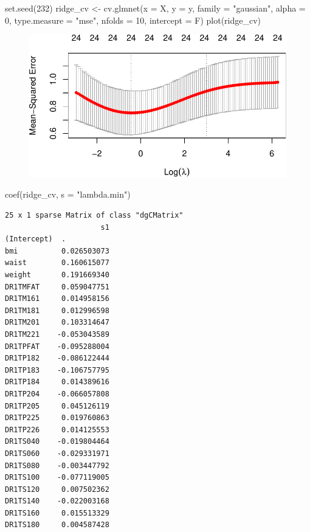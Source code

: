 \documentclass[
  letterpaper,
  DIV=11,
  numbers=noendperiod]{scrreport}
\newenvironment{Shaded}{\begin{snugshade}}{\end{snugshade}}
\newcommand{\AttributeTok}[1]{\textcolor[rgb]{0.40,0.45,0.13}{#1}}
\newcommand{\DecValTok}[1]{\textcolor[rgb]{0.68,0.00,0.00}{#1}}
\newcommand{\FunctionTok}[1]{\textcolor[rgb]{0.28,0.35,0.67}{#1}}
\newcommand{\NormalTok}[1]{\textcolor[rgb]{0.00,0.23,0.31}{#1}}
\newcommand{\OtherTok}[1]{\textcolor[rgb]{0.00,0.23,0.31}{#1}}
\newcommand{\StringTok}[1]{\textcolor[rgb]{0.13,0.47,0.30}{#1}}
\begin{document}
\begin{Shaded}
\begin{Highlighting}[]
\FunctionTok{set.seed}\NormalTok{(}\DecValTok{232}\NormalTok{)}
\NormalTok{ridge\_cv }\OtherTok{\textless{}{-}} \FunctionTok{cv.glmnet}\NormalTok{(}\AttributeTok{x =}\NormalTok{ X, }\AttributeTok{y =}\NormalTok{ y, }\AttributeTok{family =} \StringTok{"gaussian"}\NormalTok{, }\AttributeTok{alpha =} \DecValTok{0}\NormalTok{,}
                      \AttributeTok{type.measure =} \StringTok{"mse"}\NormalTok{, }\AttributeTok{nfolds =} \DecValTok{10}\NormalTok{, }\AttributeTok{intercept =}\NormalTok{ F)}
\FunctionTok{plot}\NormalTok{(ridge\_cv)}
\end{Highlighting}
\end{Shaded}

\begin{figure}[H]

{\centering \includegraphics{week5/week5_files/figure-pdf/unnamed-chunk-13-1.pdf}

}

\end{figure}

\begin{Shaded}
\begin{Highlighting}[]
\FunctionTok{coef}\NormalTok{(ridge\_cv, }\AttributeTok{s =} \StringTok{"lambda.min"}\NormalTok{)}
\end{Highlighting}
\end{Shaded}

\begin{verbatim}
25 x 1 sparse Matrix of class "dgCMatrix"
                      s1
(Intercept)  .          
bmi          0.026503073
waist        0.160615077
weight       0.191669340
DR1TMFAT     0.059047751
DR1TM161     0.014958156
DR1TM181     0.012996598
DR1TM201     0.103314647
DR1TM221    -0.053043589
DR1TPFAT    -0.095288004
DR1TP182    -0.086122444
DR1TP183    -0.106757795
DR1TP184     0.014389616
DR1TP204    -0.066057808
DR1TP205     0.045126119
DR1TP225     0.019760863
DR1TP226     0.014125553
DR1TS040    -0.019804464
DR1TS060    -0.029331971
DR1TS080    -0.003447792
DR1TS100    -0.077119005
DR1TS120     0.007502362
DR1TS140    -0.022003168
DR1TS160     0.015513329
DR1TS180     0.004587428
\end{verbatim}
\end{document}
